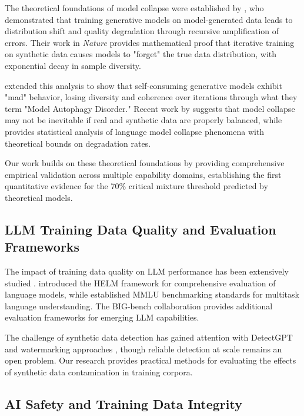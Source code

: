 \documentclass{article}
\begin{document}
The theoretical foundations of model collapse were established by \citet{shumailov2023curse}, who demonstrated that training generative models on model-generated data leads to distribution shift and quality degradation through recursive amplification of errors. Their work in \textit{Nature} provides mathematical proof that iterative training on synthetic data causes models to "forget" the true data distribution, with exponential decay in sample diversity.

\citet{alemohammad2023self} extended this analysis to show that self-consuming generative models exhibit "mad" behavior, losing diversity and coherence over iterations through what they term "Model Autophagy Disorder." Recent work by \citet{gerstgrasser2024model} suggests that model collapse may not be inevitable if real and synthetic data are properly balanced, while \citet{seddik2024bad} provides statistical analysis of language model collapse phenomena with theoretical bounds on degradation rates.

Our work builds on these theoretical foundations by providing comprehensive empirical validation across multiple capability domains, establishing the first quantitative evidence for the 70\% critical mixture threshold predicted by theoretical models.

\subsection{LLM Training Data Quality and Evaluation Frameworks}

The impact of training data quality on LLM performance has been extensively studied \citep{hoffmann2022training,muennighoff2022crosslingual}. \citet{liang2022holistic} introduced the HELM framework for comprehensive evaluation of language models, while \citet{hendrycks2020measuring} established MMLU benchmarking standards for multitask language understanding. The BIG-bench collaboration \citep{srivastava2022beyond} provides additional evaluation frameworks for emerging LLM capabilities.

The challenge of synthetic data detection has gained attention with DetectGPT \citep{mitchell2023detectgpt} and watermarking approaches \citep{kirchenbauer2023watermark}, though reliable detection at scale remains an open problem. Our research provides practical methods for evaluating the effects of synthetic data contamination in training corpora.

\subsection{AI Safety and Training Data Integrity}
\end{document}
